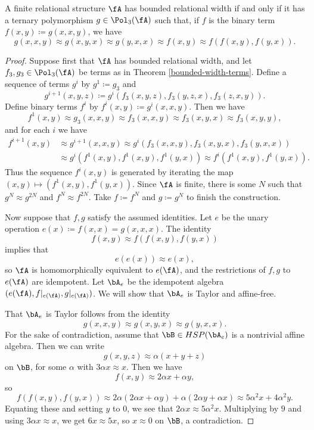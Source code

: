 \begin{thm}\label{bounded-width-term} A finite relational structure $\fA$ has bounded relational width if and only if it has a ternary polymorphism $g \in \Pol_3(\fA)$ such that, if $f$ is the binary term $f(x,y) \coloneqq g(x,x,y)$, we have
\[
g(x,x,y) \approx g(x,y,x) \approx g(y,x,x) \approx f(x,y) \approx f(f(x,y),f(y,x)).
\]
\end{thm}
\begin{proof} Suppose first that $\fA$ has bounded relational width, and let $f_3, g_3 \in \Pol_3(\fA)$ be terms as in Theorem \ref{bounded-width-terms}. Define a sequence of terms $g^i$ by $g^1 \coloneqq g_3$ and
\[
g^{i+1}(x,y,z) \coloneqq g^i(f_3(x,y,z),f_3(y,z,x),f_3(z,x,y)).
\]
Define binary terms $f^i$ by $f^i(x,y) \coloneqq g^i(x,x,y)$. Then we have
\[
f^1(x,y) \approx g_3(x,x,y) \approx f_3(x,x,y) \approx f_3(x,y,x) \approx f_3(x,y,y),
\]
and for each $i$ we have
\begin{align*}
f^{i+1}(x,y) &\approx g^{i+1}(x,x,y) \approx g^i(f_3(x,x,y), f_3(x,y,x), f_3(y,x,x))\\
&\approx g^i(f^1(x,y),f^1(x,y),f^1(y,x)) \approx f^i(f^1(x,y),f^1(y,x)).
\end{align*}
Thus the sequence $f^i(x,y)$ is generated by iterating the map $(x,y) \mapsto (f^1(x,y),f^1(y,x))$. Since $\fA$ is finite, there is some $N$ such that $g^N \approx g^{2N}$ and $f^N \approx f^{2N}$. Take $f \coloneqq f^N$ and $g \coloneqq g^N$ to finish the construction.

Now suppose that $f,g$ satisfy the assumed identities. Let $e$ be the unary operation $e(x) \coloneqq f(x,x) = g(x,x,x)$. The identity
\[
f(x,y) \approx f(f(x,y),f(y,x))
\]
implies that
\[
e(e(x)) \approx e(x),
\]
so $\fA$ is homomorphically equivalent to $e(\fA)$, and the restrictions of $f,g$ to $e(\fA)$ are idempotent. Let $\bA_e$ be the idempotent algebra $(e(\fA), f|_{e(\fA)}, g|_{e(\fA)})$. We will show that $\bA_e$ is Taylor and affine-free.

That $\bA_e$ is Taylor follows from the identity
\[
g(x,x,y) \approx g(x,y,x) \approx g(y,x,x).
\]
For the sake of contradiction, assume that $\bB \in HSP(\bA_e)$ is a nontrivial affine algebra. Then we can write
\[
g(x,y,z) \approx \alpha(x+y+z)
\]
on $\bB$, for some $\alpha$ with $3\alpha x \approx x$. Then we have
\[
f(x,y) \approx 2\alpha x + \alpha y,
\]
so
\[
f(f(x,y),f(y,x)) \approx 2\alpha(2\alpha x + \alpha y) + \alpha(2\alpha y + \alpha x) \approx 5\alpha^2 x + 4\alpha^2 y.
\]
Equating these and setting $y$ to $0$, we see that $2\alpha x \approx 5\alpha^2 x$. Multiplying by $9$ and using $3\alpha x \approx x$, we get $6x \approx 5x$, so $x \approx 0$ on $\bB$, a contradiction.
\end{proof}

